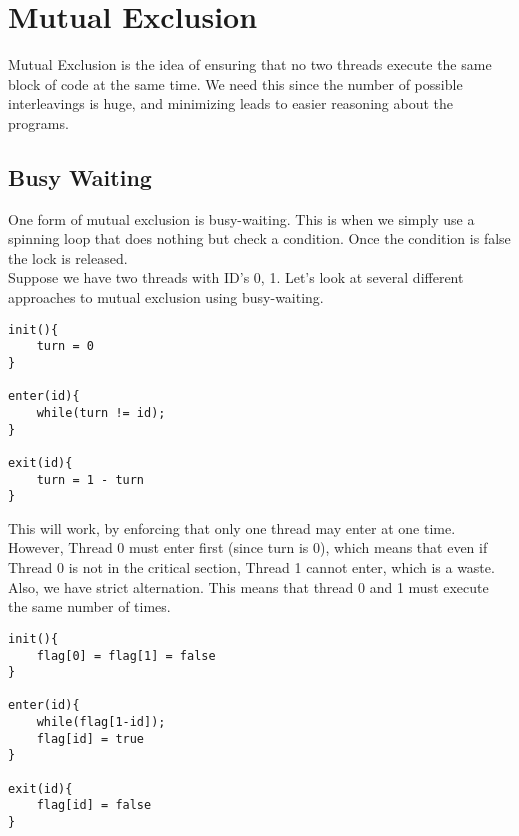 \documentclass[12pt]{article}
\theoremstyle{definition}
\begin{document}
\section{Mutual Exclusion}
Mutual Exclusion is the idea of ensuring that no two threads execute the same block of code at the same time. We need this since the number of possible interleavings is huge, and minimizing leads to easier reasoning about the programs. 
\\ \linebreak
\subsection{Busy Waiting}
One form of mutual exclusion is busy-waiting. This is when we simply use a spinning loop that does nothing but check a condition. Once the condition is false the lock is released. 
\\ \linebreak
Suppose we have two threads with ID's 0, 1. Let's look at several different approaches to mutual exclusion using busy-waiting.
\begin{lstlisting}
init(){
	turn = 0
}

enter(id){
	while(turn != id);
}

exit(id){
	turn = 1 - turn
}
\end{lstlisting}
This will work, by enforcing that only one thread may enter at one time. However, Thread 0 must enter first (since turn is 0), which means that even if Thread 0 is not in the critical section, Thread 1 cannot enter, which is a waste. Also, we have strict alternation. This means that thread 0 and 1 must execute the same number of times. 
\\ \linebreak
\begin{lstlisting}
init(){
	flag[0] = flag[1] = false
}

enter(id){
	while(flag[1-id]);
	flag[id] = true
}

exit(id){
	flag[id] = false
}
\end{lstlisting}
\end{document}
